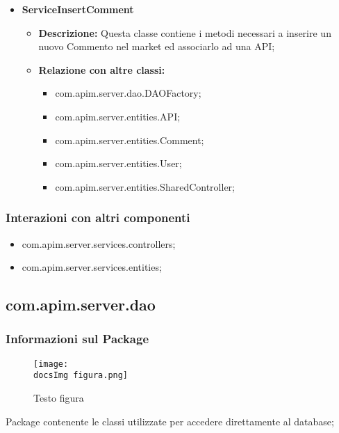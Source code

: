 {{{{\begin{itemize}
\begin{itemize}
            \item \textbf{Relazione con altre classi:}
            \begin{itemize}
              \item com.apim.server.dao.DAOFactory;
              \item com.apim.server.entities.API;
              \item com.apim.server.entities.SharedController;
            \end{itemize}
          \end{itemize}
          \item \textbf{ServiceInsertComment}
          \begin{itemize}
            \item \textbf{Descrizione:} Questa classe contiene i metodi necessari a inserire un nuovo Commento nel market ed associarlo ad una API;
            \item \textbf{Relazione con altre classi:}
            \begin{itemize}
              \item com.apim.server.dao.DAOFactory;
              \item com.apim.server.entities.API;
              \item com.apim.server.entities.Comment;
              \item com.apim.server.entities.User;
              \item com.apim.server.entities.SharedController;
            \end{itemize}
          \end{itemize}
       \end{itemize}
       \subsubsection{Interazioni con altri componenti}
          \begin{itemize}
            \item com.apim.server.services.controllers;
            \item com.apim.server.services.entities;
          \end{itemize}
          
          
          \subsection{com.apim.server.dao}{
    \subsubsection{Informazioni sul Package}
        \begin{figure}[ht]
          \centering
          \texttt{[image: \\docsImg figura.png]}
          \caption{Testo figura}
          \label{Testo figura}
        \end{figure}
       Package  contenente le classi utilizzate per accedere direttamente al database;
}}}}}
